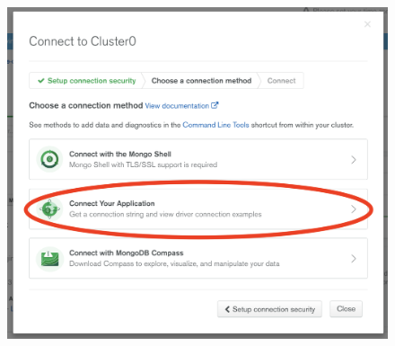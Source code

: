 \documentclass{42-en}
\begin{document}
\begin{figure}[H]
    \begin{center}
        \includegraphics[width=14cm]{WEB/mongo_11.png}
    \end{center}
\end{figure}
\end{document}
